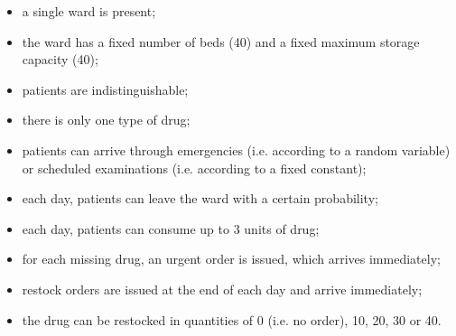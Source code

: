     \begin{itemize}
      \item a single ward is present;
      \item the ward has a fixed number of beds (40) and a fixed maximum storage capacity (40);
      \item patients are indistinguishable;
      \item there is only one type of drug;
      \item patients can arrive through emergencies (i.e. according to a random variable) or scheduled examinations (i.e. according to a fixed constant);
      \item each day, patients can leave the ward with a certain probability;
      \item each day, patients can consume up to 3 units of drug;
      \item for each missing drug, an urgent order is issued, which arrives immediately;
      \item restock orders are issued at the end of each day and arrive immediately;
      \item the drug can be restocked in quantities of 0 (i.e. no order), 10, 20, 30 or 40.
    \end{itemize}
    
